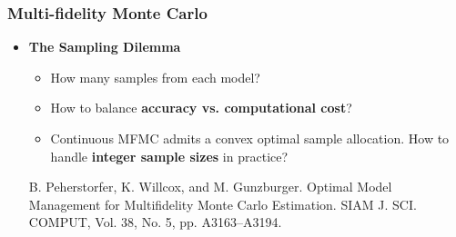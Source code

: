 \documentclass{beamer}
\begin{document}
\begin{frame}[t]
\frametitle{Multi-fidelity Monte Carlo}
\begin{itemize}[leftmargin=5pt] 
    
    \item[$\triangleright$] \textcolor{myblue3}{\bf The Sampling Dilemma}
    \begin{itemize}[leftmargin=15pt] 
    \item[$\circ$] How many samples from each model?
    \item[$\circ$] How to balance \textbf{accuracy vs. computational cost}?
    \item[$\circ$] Continuous MFMC admits a convex optimal sample allocation. How to handle \textbf{integer sample sizes} in practice?
    \end{itemize}

    \vspace{1mm}

    {\fontsize{8}{8}\selectfont \textcolor{mygray2}{B. Peherstorfer, K. Willcox, and M. Gunzburger. Optimal Model Management for Multifidelity Monte Carlo Estimation. SIAM J. SCI. COMPUT, Vol. 38, No. 5, pp. A3163–A3194.}\par}
    
\end{itemize}
\end{frame}
\end{document}
